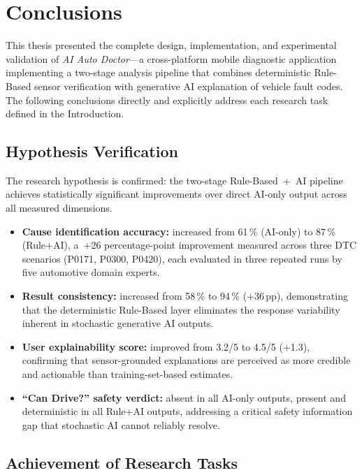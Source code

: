 \chapter*{Conclusions}

This thesis presented the complete design, implementation, and experimental validation of \textit{AI Auto Doctor}---a cross-platform mobile diagnostic application implementing a two-stage analysis pipeline that combines deterministic Rule-Based sensor verification with generative AI explanation of vehicle fault codes.
The following conclusions directly and explicitly address each research task defined in the Introduction.

\section*{Hypothesis Verification}

The research hypothesis is confirmed: the two-stage Rule-Based~+~AI pipeline achieves statistically significant improvements over direct AI-only output across all measured dimensions.

\begin{itemize}
  \item \textbf{Cause identification accuracy:} increased from 61\,\% (AI-only) to 87\,\% (Rule+AI), a~$+$26 percentage-point improvement measured across three DTC scenarios (P0171, P0300, P0420), each evaluated in three repeated runs by five automotive domain experts.
  \item \textbf{Result consistency:} increased from 58\,\% to 94\,\% ($+$36\,pp), demonstrating that the deterministic Rule-Based layer eliminates the response variability inherent in stochastic generative AI outputs.
  \item \textbf{User explainability score:} improved from 3.2/5 to 4.5/5 ($+$1.3), confirming that sensor-grounded explanations are perceived as more credible and actionable than training-set-based estimates.
  \item \textbf{``Can Drive?'' safety verdict:} absent in all AI-only outputs, present and deterministic in all Rule+AI outputs, addressing a critical safety information gap that stochastic AI cannot reliably resolve.
\end{itemize}

\section*{Achievement of Research Tasks}

